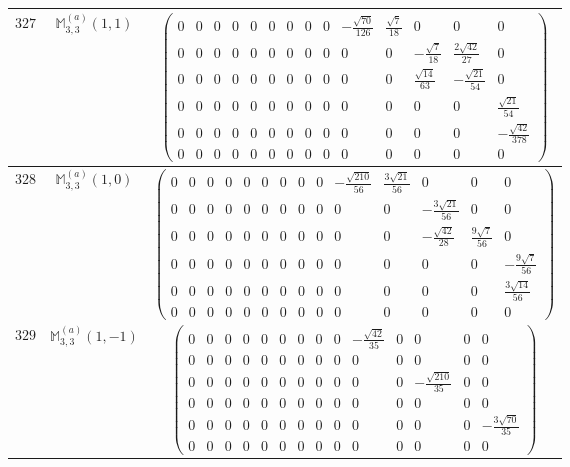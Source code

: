 \documentclass[fleqn,8pt,landscape]{jsarticle}
\begin{document}
\begin{center}
\begin{longtable}{ccc}
$ 327 $ & $ \mathbb{M}_{3,3}^{(a)}(1,1) $ & $ \begin{pmatrix} 0 & 0 & 0 & 0 & 0 & 0 & 0 & 0 & 0 & - \frac{\sqrt{70}}{126} & \frac{\sqrt{7}}{18} & 0 & 0 & 0 \\ 0 & 0 & 0 & 0 & 0 & 0 & 0 & 0 & 0 & 0 & 0 & - \frac{\sqrt{7}}{18} & \frac{2 \sqrt{42}}{27} & 0 \\ 0 & 0 & 0 & 0 & 0 & 0 & 0 & 0 & 0 & 0 & 0 & \frac{\sqrt{14}}{63} & - \frac{\sqrt{21}}{54} & 0 \\ 0 & 0 & 0 & 0 & 0 & 0 & 0 & 0 & 0 & 0 & 0 & 0 & 0 & \frac{\sqrt{21}}{54} \\ 0 & 0 & 0 & 0 & 0 & 0 & 0 & 0 & 0 & 0 & 0 & 0 & 0 & - \frac{\sqrt{42}}{378} \\ 0 & 0 & 0 & 0 & 0 & 0 & 0 & 0 & 0 & 0 & 0 & 0 & 0 & 0 \end{pmatrix} $ \\ \hline
$ 328 $ & $ \mathbb{M}_{3,3}^{(a)}(1,0) $ & $ \begin{pmatrix} 0 & 0 & 0 & 0 & 0 & 0 & 0 & 0 & 0 & - \frac{\sqrt{210}}{56} & \frac{3 \sqrt{21}}{56} & 0 & 0 & 0 \\ 0 & 0 & 0 & 0 & 0 & 0 & 0 & 0 & 0 & 0 & 0 & - \frac{3 \sqrt{21}}{56} & 0 & 0 \\ 0 & 0 & 0 & 0 & 0 & 0 & 0 & 0 & 0 & 0 & 0 & - \frac{\sqrt{42}}{28} & \frac{9 \sqrt{7}}{56} & 0 \\ 0 & 0 & 0 & 0 & 0 & 0 & 0 & 0 & 0 & 0 & 0 & 0 & 0 & - \frac{9 \sqrt{7}}{56} \\ 0 & 0 & 0 & 0 & 0 & 0 & 0 & 0 & 0 & 0 & 0 & 0 & 0 & \frac{3 \sqrt{14}}{56} \\ 0 & 0 & 0 & 0 & 0 & 0 & 0 & 0 & 0 & 0 & 0 & 0 & 0 & 0 \end{pmatrix} $ \\ \hline
$ 329 $ & $ \mathbb{M}_{3,3}^{(a)}(1,-1) $ & $ \begin{pmatrix} 0 & 0 & 0 & 0 & 0 & 0 & 0 & 0 & 0 & - \frac{\sqrt{42}}{35} & 0 & 0 & 0 & 0 \\ 0 & 0 & 0 & 0 & 0 & 0 & 0 & 0 & 0 & 0 & 0 & 0 & 0 & 0 \\ 0 & 0 & 0 & 0 & 0 & 0 & 0 & 0 & 0 & 0 & 0 & - \frac{\sqrt{210}}{35} & 0 & 0 \\ 0 & 0 & 0 & 0 & 0 & 0 & 0 & 0 & 0 & 0 & 0 & 0 & 0 & 0 \\ 0 & 0 & 0 & 0 & 0 & 0 & 0 & 0 & 0 & 0 & 0 & 0 & 0 & - \frac{3 \sqrt{70}}{35} \\ 0 & 0 & 0 & 0 & 0 & 0 & 0 & 0 & 0 & 0 & 0 & 0 & 0 & 0 \end{pmatrix} $ \\ \hline

\end{longtable}
\end{center}
\end{document}
